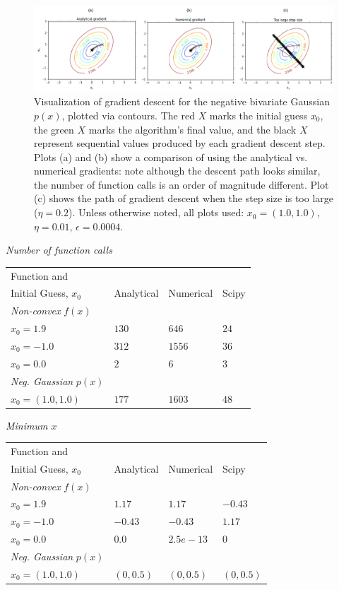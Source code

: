 \documentclass{article}
\begin{document}
\begin{figure}[!ht]
\centering
\includegraphics[scale=0.9]{negGaussianDescent.pdf}
\caption{Visualization of gradient descent for the negative bivariate Gaussian $p(x)$, plotted via contours.  The red $X$ marks the initial guess $x_0$, the green $X$ marks the algorithm's final value, and the black $X$ represent sequential values produced by each gradient descent step.  Plots (a) and (b) show a comparison of using the analytical vs. numerical gradients: note although the descent path looks similar, the number of function calls is an order of magnitude different.   Plot (c) shows the path of gradient descent when the step size is too large ($\eta = 0.2$). Unless otherwise noted, all plots used: $x_0 = (1.0,1.0)$, $\eta = 0.01$, $\epsilon = 0.0004$.}
\label{gauss}
\end{figure}



\textit{Number of function calls}

\begin{tabular}{|l|l|l|l|}
\hline
Function and & & &\\ Initial Guess, $x_0$ & Analytical & Numerical & Scipy \\ \hline
\textit{Non-convex} $f(x)$ & & &\\ \hline
$x_0 = 1.9$ & $130$ & $646$ & $24$\\\hline
$x_0 = -1.0$ & $312$ & $1556$ & $36$ \\ \hline
$x_0 = 0.0$ & $2$ & $6$ & $3$\\ \hline
\textit{Neg. Gaussian} $p(x)$ & & & \\ \hline
$x_0 = (1.0,1.0)$ & $177$ & $1603$ & $48$ \\ \hline
\end{tabular}

\textit{Minimum $x$}

\begin{tabular}{|l|l|l|l|}
\hline
Function and & & &\\ Initial Guess, $x_0$ & Analytical & Numerical & Scipy \\ \hline
\textit{Non-convex} $f(x)$ & & &\\ \hline
$x_0 = 1.9$ & $1.17$ & $1.17$ & $-0.43$\\\hline
$x_0 = -1.0$ & $-0.43$ & $-0.43$ & $1.17$ \\ \hline
$x_0 = 0.0$ & $0.0$ & $2.5e-13$ & $0$\\ \hline
\textit{Neg. Gaussian} $p(x)$ & & & \\ \hline
$x_0 = (1.0,1.0)$ & $(0,0.5)$ & $(0,0.5)$ & $(0,0.5)$ \\ \hline
\end{tabular}
\end{document}
